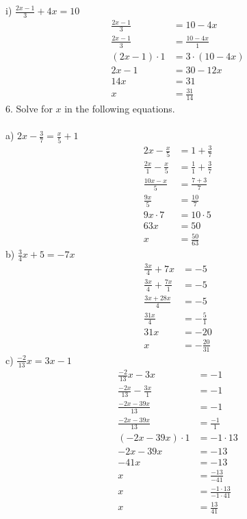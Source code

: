 \documentclass[12pt]{article}
\begin{document}
i) $\displaystyle \frac{2x-1}{3}+4x=10$
\begin{align*}
\displaystyle \frac{2x-1}{3}&=10-4x \\
\displaystyle \frac{2x-1}{3}&=\displaystyle \frac{10-4x}{1} \\
(2x-1)\cdot1&=3\cdot(10-4x) \\
2x-1&=30-12x \\
14x&=31 \\
x&=\displaystyle \frac{31}{14}
\end{align*}
6. Solve for $x$ in the following equations. \\
\\
a) $2x-\displaystyle \frac{3}{7}=\displaystyle \frac{x}{5}+1$
\begin{align*}
2x-\displaystyle \frac{x}{5}&=1+\displaystyle \frac{3}{7} \\
\displaystyle \frac{2x}{1}-\displaystyle \frac{x}{5}&=\displaystyle \frac{1}{1}+\displaystyle \frac{3}{7} \\
\displaystyle \frac{10x-x}{5}&=\displaystyle \frac{7+3}{7} \\
\displaystyle \frac{9x}{5}&=\displaystyle \frac{10}{7} \\
9x\cdot7&=10\cdot5 \\
63x&=50 \\
x&=\displaystyle \frac{50}{63}
\end{align*}
b) $\displaystyle \frac{3}{4}x+5=-7x$
\begin{align*}
\displaystyle \frac{3x}{4}+7x&=-5 \\
\displaystyle \frac{3x}{4}+\displaystyle \frac{7x}{1}&=-5 \\
\displaystyle \frac{3x+28x}{4}&=-5 \\
\displaystyle \frac{31x}{4}&=-\displaystyle \frac{5}{1} \\
31x&=-20 \\
x&=-\displaystyle \frac{20}{31}
\end{align*}
c) $\displaystyle \frac{-2}{13}x=3x-1$
\begin{align*}
\displaystyle \frac{-2}{13}x-3x&=-1 \\
\displaystyle \frac{-2x}{13}-\displaystyle \frac{3x}{1}&=-1 \\
\displaystyle \frac{-2x-39x}{13}&=-1 \\
\displaystyle \frac{-2x-39x}{13}&=\displaystyle \frac{-1}{1} \\
(-2x-39x)\cdot1&=-1\cdot13 \\
-2x-39x&=-13 \\
-41x&=-13 \\
x&=\displaystyle \frac{-13}{-41} \\
x&=\displaystyle \frac{-1\cdot13}{-1\cdot41} \\
x&=\displaystyle \frac{13}{41}
\end{align*}
\end{document}
